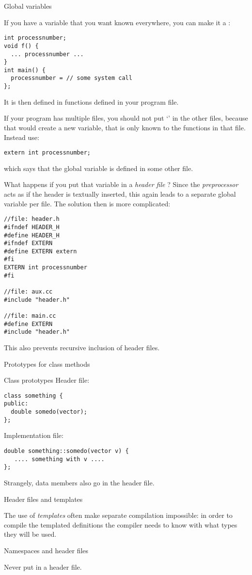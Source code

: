  {Global variables}
\label{ex:globalvar}

If you have a variable that you want known everywhere, you can make it
a :
\begin{verbatim}
int processnumber;
void f() {
  ... processnumber ...
}
int main() {
  processnumber = // some system call
};
\end{verbatim}
It is then defined in functions defined in your program file.

If your program has multiple files, you should not put `'
in the other files, because that would create a new variable, that is
only known to the functions in that file. Instead use:
\begin{verbatim}
extern int processnumber;
\end{verbatim}
which says that the global variable  is defined in
some other file.

What happens if you put that variable in a
%
\emph{header file}%
%
? Since the
%
\emph{preprocessor}%
acts as if the header is textually inserted, this again leads to
a separate global variable per file. The solution then is more
complicated:
\begin{verbatim}
//file: header.h
#ifndef HEADER_H
#define HEADER_H
#ifndef EXTERN
#define EXTERN extern
#fi
EXTERN int processnumber
#fi

//file: aux.cc
#include "header.h"

//file: main.cc
#define EXTERN
#include "header.h"
\end{verbatim}

This also prevents recursive inclusion of header files.

 {Prototypes for class methods}

\begin{block}{Class prototypes}
  \label{sl:class-proto}
  Header file:
\begin{verbatim}
class something {
public:
  double somedo(vector);
};
\end{verbatim}

Implementation file:
\begin{verbatim}
double something::somedo(vector v) {
   .... something with v ....
};
\end{verbatim}
Strangely, data members also go in the header file.
\end{block}

 {Header files and templates}

The use of \emph{templates}
often make separate compilation impossible: in order to compile the
templated definitions the compiler needs to know with what types they
will be used.

 {Namespaces and header files}

Never put  in a header file.
